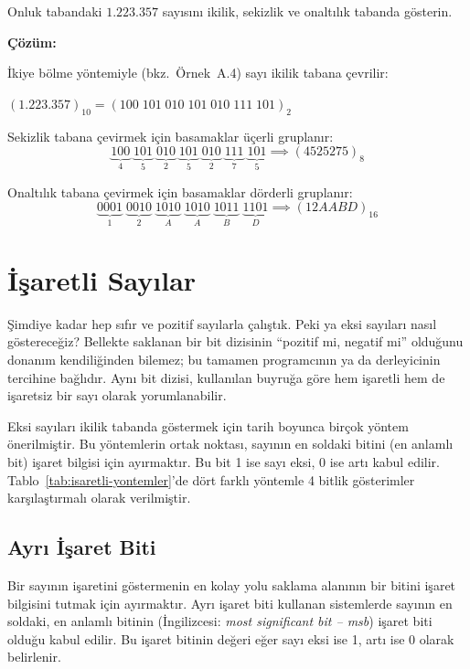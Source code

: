 \begin{ornek}[A.9]
Onluk tabandaki $1.223.357$ sayısını ikilik, sekizlik ve onaltılık tabanda gösterin.

\textbf{Çözüm:}

İkiye bölme yöntemiyle (bkz.\ Örnek~A.4) sayı ikilik tabana çevrilir:

$(1.223.357)_{10} = (100\;101\;010\;101\;010\;111\;101)_2$

Sekizlik tabana çevirmek için basamaklar üçerli gruplanır:
\[
\underbrace{100}_{4}\;\underbrace{101}_{5}\;\underbrace{010}_{2}\;\underbrace{101}_{5}\;\underbrace{010}_{2}\;\underbrace{111}_{7}\;\underbrace{101}_{5} \implies (4525275)_8
\]

Onaltılık tabana çevirmek için basamaklar dörderli gruplanır:
\[
\underbrace{0001}_{1}\;\underbrace{0010}_{2}\;\underbrace{1010}_{A}\;\underbrace{1010}_{A}\;\underbrace{1011}_{B}\;\underbrace{1101}_{D} \implies (12AABD)_{16}
\]
\end{ornek}


\section{İşaretli Sayılar}
\label{sec:isaretli-sayilar}

Şimdiye kadar hep sıfır ve pozitif sayılarla çalıştık. Peki ya eksi sayıları nasıl göstereceğiz? Bellekte saklanan bir bit dizisinin ``pozitif mi, negatif mi'' olduğunu donanım kendiliğinden bilemez; bu tamamen programcının ya da derleyicinin tercihine bağlıdır. Aynı bit dizisi, kullanılan buyruğa göre hem işaretli hem de işaretsiz bir sayı olarak yorumlanabilir.

Eksi sayıları ikilik tabanda göstermek için tarih boyunca birçok yöntem önerilmiştir. Bu yöntemlerin ortak noktası, sayının en soldaki bitini (en anlamlı bit) işaret bilgisi için ayırmaktır. Bu bit 1 ise sayı eksi, 0 ise artı kabul edilir. Tablo~\ref{tab:isaretli-yontemler}'de dört farklı yöntemle 4 bitlik gösterimler karşılaştırmalı olarak verilmiştir.

\subsection{Ayrı İşaret Biti}

Bir sayının işaretini göstermenin en kolay yolu saklama alanının bir bitini işaret bilgisini tutmak için ayırmaktır. Ayrı işaret biti kullanan sistemlerde sayının en soldaki, en anlamlı bitinin (İngilizcesi: \textit{most significant bit -- msb}) işaret biti olduğu kabul edilir. Bu işaret bitinin değeri eğer sayı eksi ise 1, artı ise 0 olarak belirlenir.

